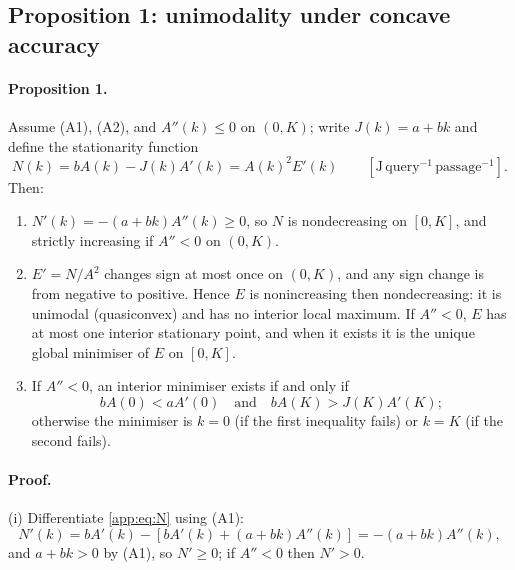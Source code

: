 \subsection{Proposition 1: unimodality under concave accuracy}\label{app:prop:unimodal}

\paragraph{Proposition 1.} Assume (A1), (A2), and $A''(k)\le0$ on $(0,K)$; write
$J(k)=a+bk$ and define the stationarity function
\begin{equation}\label{app:eq:N}
  N(k)=bA(k)-J(k)A'(k)=A(k)^{2}E'(k)
  \qquad [\mathrm{J\,query^{-1}\,passage^{-1}}].
\end{equation}
Then:
\begin{enumerate}
  \item[(i)] $N'(k)=-(a+bk)A''(k)\ge0$, so $N$ is nondecreasing on $[0,K]$, and
  strictly increasing if $A''<0$ on $(0,K)$.
  \item[(ii)] $E'=N/A^{2}$ changes sign at most once on $(0,K)$, and any sign
  change is from negative to positive. Hence $E$ is nonincreasing then
  nondecreasing: it is unimodal (quasiconvex) and has no interior local maximum.
  If $A''<0$, $E$ has at most one interior stationary point, and when it exists it
  is the unique global minimiser of $E$ on $[0,K]$.
  \item[(iii)] If $A''<0$, an interior minimiser exists if and only if
  \begin{equation}\label{app:eq:interior}
    bA(0)<aA'(0)
    \quad\text{and}\quad
    bA(K)>J(K)A'(K);
  \end{equation}
  otherwise the minimiser is $k=0$ (if the first inequality fails) or $k=K$ (if
  the second fails).
\end{enumerate}

\paragraph{Proof.} (i) Differentiate \eqref{app:eq:N} using (A1):
\begin{equation}\label{app:eq:Nprime}
  N'(k)=bA'(k)-\left[bA'(k)+(a+bk)A''(k)\right]=-(a+bk)A''(k),
\end{equation}
and $a+bk>0$ by (A1), so $N'\ge0$; if $A''<0$ then $N'>0$.

